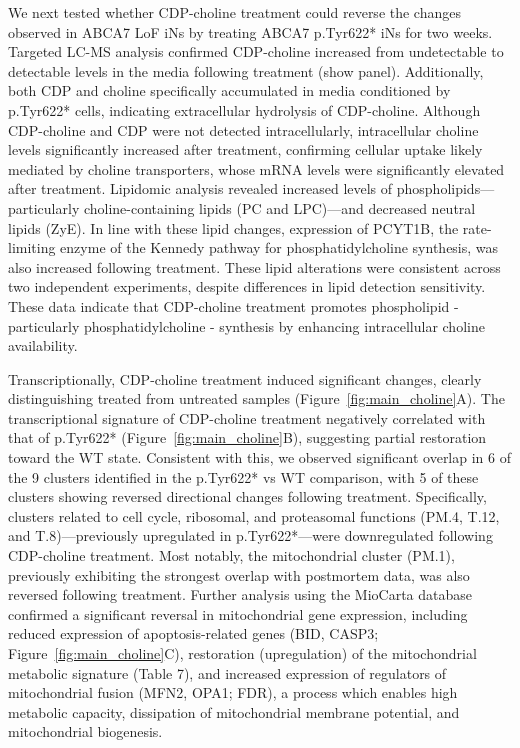We next tested whether CDP-choline treatment could reverse the changes observed in ABCA7 LoF iNs by treating ABCA7 p.Tyr622* iNs for two weeks. Targeted LC-MS analysis confirmed CDP-choline increased from undetectable to detectable levels in the media following treatment (show panel). Additionally, both CDP and choline specifically accumulated in media conditioned by p.Tyr622* cells, indicating extracellular hydrolysis of CDP-choline. Although CDP-choline and CDP were not detected intracellularly, intracellular choline levels significantly increased after treatment, confirming cellular uptake likely mediated by choline transporters, whose mRNA levels were significantly elevated after treatment. Lipidomic analysis revealed increased levels of phospholipids—particularly choline-containing lipids (PC and LPC)—and decreased neutral lipids (ZyE). In line with these lipid changes, expression of PCYT1B, the rate-limiting enzyme of the Kennedy pathway for phosphatidylcholine synthesis, was also increased following treatment. These lipid alterations were consistent across two independent experiments, despite differences in lipid detection sensitivity. These data indicate that CDP-choline treatment promotes phospholipid - particularly phosphatidylcholine - synthesis by enhancing intracellular choline availability.

Transcriptionally, CDP-choline treatment induced significant changes, clearly distinguishing treated from untreated samples (Figure~\ref{fig:main_choline}A). The transcriptional signature of CDP-choline treatment negatively correlated with that of p.Tyr622* (Figure~\ref{fig:main_choline}B), suggesting partial restoration toward the WT state. Consistent with this, we observed significant overlap in 6 of the 9 clusters identified in the p.Tyr622* vs WT comparison, with 5 of these clusters showing reversed directional changes following treatment. Specifically, clusters related to cell cycle, ribosomal, and proteasomal functions (PM.4, T.12, and T.8)—previously upregulated in p.Tyr622*—were downregulated following CDP-choline treatment. Most notably, the mitochondrial cluster (PM.1), previously exhibiting the strongest overlap with postmortem data, was also reversed following treatment. Further analysis using the MioCarta database confirmed a significant reversal in mitochondrial gene expression, including reduced expression of apoptosis-related genes (BID, CASP3; Figure~\ref{fig:main_choline}C), restoration (upregulation) of the mitochondrial metabolic signature (Table 7), and increased expression of regulators of mitochondrial fusion (MFN2, OPA1; FDR), a process which enables high metabolic capacity, dissipation of mitochondrial membrane potential, and mitochondrial biogenesis.

